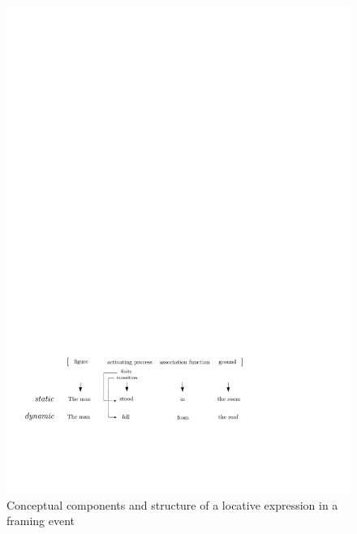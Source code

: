 \begin{figure}[htp]
 \centering

 \includegraphics[width=4.5in]{Graphic/Pictures/Talmy-schema.pdf}

 \caption{Conceptual components and  structure of a locative expression in a
framing event 
\citep[221]{Talm00a}  \label{ex:SPA-Talmy}}

\end{figure}



